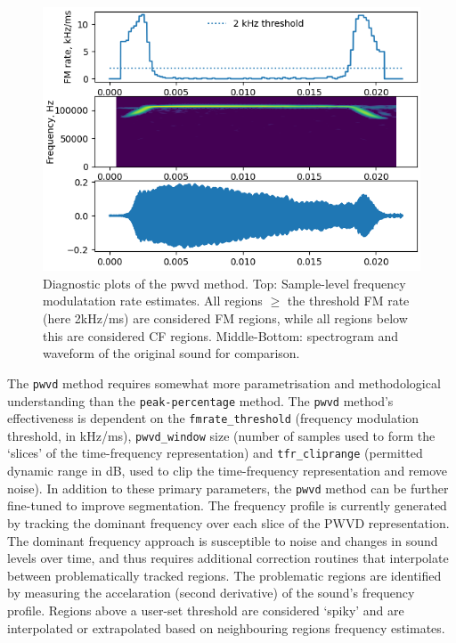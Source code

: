 \documentclass[
]{book}
\begin{document}
\begin{figure}
\includegraphics[width=8.07in]{original_papers/itsfm-paper/figures/pwvd_fmrate_diagnostic} \caption{Diagnostic plots of the pwvd method. Top: Sample-level frequency modulatation rate estimates. All regions $\geq$ the threshold FM rate (here 2kHz/ms) are considered FM regions, while all regions below this are considered CF regions. Middle-Bottom: spectrogram and waveform of the original sound for comparison.}\label{fig:fmratediags}
\end{figure}

The \texttt{pwvd} method requires somewhat more parametrisation and methodological understanding than the \texttt{peak-percentage} method. The \texttt{pwvd} method's effectiveness is dependent on the \texttt{fmrate\_threshold} (frequency modulation threshold, in kHz/ms), \texttt{pwvd\_window} size (number of samples used to form the `slices' of the time-frequency representation) and \texttt{tfr\_cliprange} (permitted dynamic range in dB, used to clip the time-frequency representation and remove noise). In addition to these primary parameters, the \texttt{pwvd} method can be further fine-tuned to improve segmentation. The frequency profile is currently generated by tracking the dominant frequency over each slice of the PWVD representation. The dominant frequency approach is susceptible to noise and changes in sound levels over time, and thus requires additional correction routines that interpolate between problematically tracked regions. The problematic regions are identified by measuring the accelaration (second derivative) of the sound's frequency profile. Regions above a user-set threshold are considered `spiky' and are interpolated or extrapolated based on neighbouring regions frequency estimates.
\end{document}
